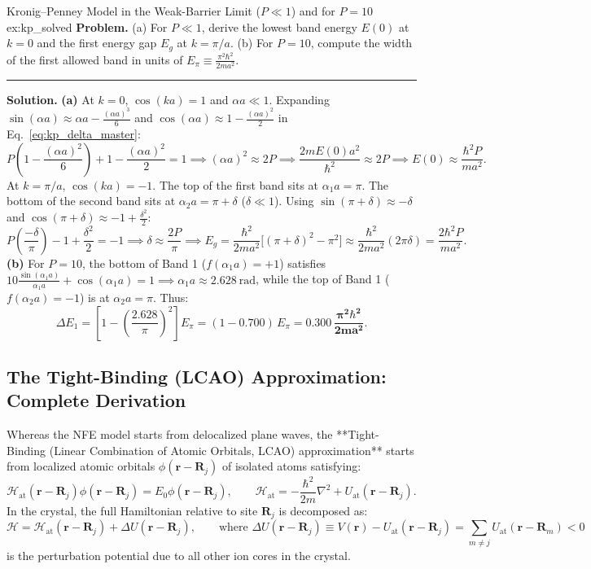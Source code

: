 \documentclass[11pt,a4paper]{article}
\newcommand{\hb}{\hbar}
\newcommand{\hbarsq}{\hb^2}
\newcommand{\RR}{\mathbf{R}}
\newcommand{\rvec}{\mathbf{r}}
\begin{document}
\begin{examplebox}{Kronig--Penney Model in the Weak-Barrier Limit ($P \ll 1$) and for $P = 10$}{ex:kp_solved}
\textbf{Problem.} (a) For $P \ll 1$, derive the lowest band energy $E(0)$ at $k=0$ and the first energy gap $E_g$ at $k = \pi/a$. (b) For $P = 10$, compute the width of the first allowed band in units of $E_\pi \equiv \frac{\pi^2\hbarsq}{2ma^2}$.
\vspace{0.2cm}\hrule\vspace{0.2cm}
\textbf{Solution.}
\textbf{(a)} At $k = 0$, $\cos(ka) = 1$ and $\alpha a \ll 1$. Expanding $\sin(\alpha a) \approx \alpha a - \frac{(\alpha a)^3}{6}$ and $\cos(\alpha a) \approx 1 - \frac{(\alpha a)^2}{2}$ in Eq.~\eqref{eq:kp_delta_master}:
\[
    P\left(1 - \frac{(\alpha a)^2}{6}\right) + 1 - \frac{(\alpha a)^2}{2} = 1 \implies (\alpha a)^2 \approx 2P \implies \frac{2mE(0)a^2}{\hbarsq} \approx 2P \implies \boxed{E(0) \approx \frac{\hbarsq P}{ma^2}.}
\]
At $k = \pi/a$, $\cos(ka) = -1$. The top of the first band sits at $\alpha_1 a = \pi$. The bottom of the second band sits at $\alpha_2 a = \pi + \delta$ ($\delta \ll 1$). Using $\sin(\pi+\delta) \approx -\delta$ and $\cos(\pi+\delta) \approx -1 + \frac{\delta^2}{2}$:
\[
    P\left(\frac{-\delta}{\pi}\right) - 1 + \frac{\delta^2}{2} = -1 \implies \delta \approx \frac{2P}{\pi} \implies E_g = \frac{\hbarsq}{2ma^2}\big[(\pi+\delta)^2 - \pi^2\big] \approx \frac{\hbarsq}{2ma^2}(2\pi\delta) = \boxed{\frac{2\hbarsq P}{ma^2}.}
\]
\textbf{(b)} For $P = 10$, the bottom of Band 1 ($f(\alpha_1 a) = +1$) satisfies $10\frac{\sin(\alpha_1 a)}{\alpha_1 a} + \cos(\alpha_1 a) = 1 \implies \alpha_1 a \approx 2.628\ \mathrm{rad}$, while the top of Band 1 ($f(\alpha_2 a) = -1$) is at $\alpha_2 a = \pi$. Thus:
\[
    \Delta E_1 = \left[1 - \left(\frac{2.628}{\pi}\right)^2\right]E_\pi = (1 - 0.700)\,E_\pi = \mathbf{0.300\,\frac{\pi^2\hbarsq}{2ma^2}}.
\]
\end{examplebox}

\subsection{The Tight-Binding (LCAO) Approximation: Complete Derivation}
Whereas the NFE model starts from delocalized plane waves, the **Tight-Binding (Linear Combination of Atomic Orbitals, LCAO) approximation** starts from localized atomic orbitals $\phi(\rvec - \RR_j)$ of isolated atoms satisfying:
\begin{equation}
    \mathcal{H}_{\mathrm{at}}(\rvec - \RR_j)\phi(\rvec - \RR_j) = E_0 \phi(\rvec - \RR_j), \qquad \mathcal{H}_{\mathrm{at}} = -\frac{\hbarsq}{2m}\nabla^2 + U_{\mathrm{at}}(\rvec - \RR_j).
\end{equation}
In the crystal, the full Hamiltonian relative to site $\RR_j$ is decomposed as:
\begin{equation}
    \mathcal{H} = \mathcal{H}_{\mathrm{at}}(\rvec - \RR_j) + \Delta U(\rvec - \RR_j), \qquad \text{where } \Delta U(\rvec - \RR_j) \equiv V(\rvec) - U_{\mathrm{at}}(\rvec - \RR_j) = \sum_{m \neq j} U_{\mathrm{at}}(\rvec - \RR_m) < 0
\end{equation}
is the perturbation potential due to all other ion cores in the crystal.
\end{document}
